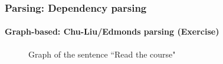 \documentclass[xcolor=table]{beamer}
\begin{document}
\begin{frame}
\frametitle{Parsing: Dependency parsing}
\framesubtitle{Graph-based: Chu-Liu/Edmonds parsing (Exercise)}

\begin{figure}
	\centering
	\caption{Graph of the sentence ``Read the course" }
\end{figure}

\end{frame}


\end{document}
